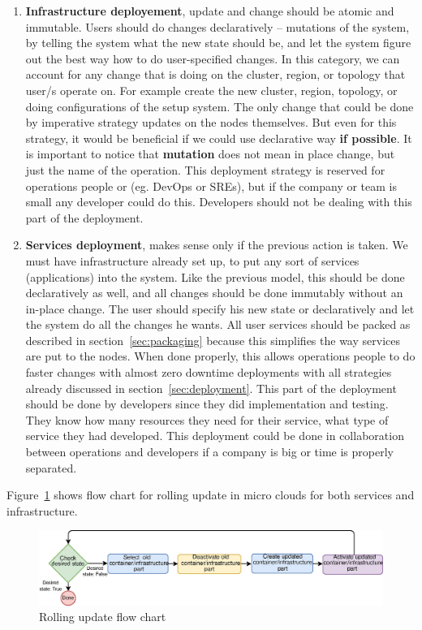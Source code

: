 \begin{enumerate}[start=1,label={(\bfseries \arabic*)}]
	\item \textbf{Infrastructure deployement}, update and change should be atomic and immutable. Users should do changes declaratively -- mutations of the system, by telling the system what the new state should be, and let the system figure out the best way how to do user-specified changes. In this category, we can account for any change that is doing on the cluster, region, or topology that user/s operate on. For example create the new cluster, region, topology, or doing configurations of the setup system. The only change that could be done by imperative strategy updates on the nodes themselves. But even for this strategy, it would be beneficial if we could use declarative way \textbf{if possible}. It is important to notice that \textbf{mutation} does not mean in place change, but just the name of the operation. This deployment strategy is reserved for operations people or (eg. DevOps or SREs), but if the company or team is small any developer could do this. Developers should not be dealing with this part of the deployment.
	\item \textbf{Services deployment}, makes sense only if the previous action is taken. We must have infrastructure already set up, to put any sort of services (applications) into the system. Like the previous model, this should be done declaratively as well, and all changes should be done immutably without an in-place change. The user should specify his new state or  declaratively and let the system do all the changes he wants. All user services should be packed as described in section~\ref{sec:packaging} because this simplifies the way services are put to the nodes. When done properly, this allows operations people to do faster changes with almost zero downtime deployments with all strategies already discussed in section~\ref{sec:deployment}. This part of the deployment should be done by developers since they did implementation and testing. They know how many resources they need for their service, what type of service they had developed. This deployment could be done in collaboration between operations and developers if a company is big or time is properly separated.
\end{enumerate}

\noindent
Figure~\ref{fig:fig24} shows flow chart for rolling update in micro clouds for both services and infrastructure.

\begin{figure}[H]
	\begin{center}
		\includegraphics[width=\columnwidth]{images/Figure24}
	\end{center}
	\vspace{-0.5cm}
	\caption{Rolling update flow chart}
	\label{fig:fig24}
\end{figure}

